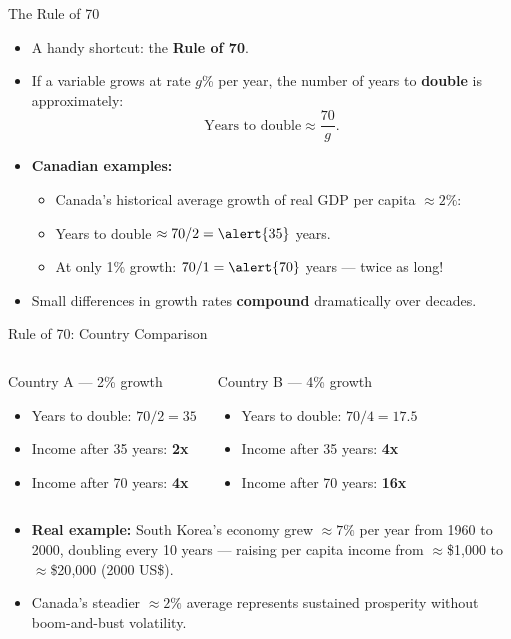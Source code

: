 \documentclass[aspectratio=169]{beamer}
\begin{document}
\begin{frame}{The Rule of 70}
\transfade
\begin{itemize}
  \item A handy shortcut: the \textbf{Rule of 70}.
  \item If a variable grows at rate $g$\% per year, the number of years to \textbf{double} is approximately:
  \[
    \text{Years to double} \approx \frac{70}{g}.
  \]
  \item \textbf{Canadian examples:}
  \begin{itemize}
    \item Canada's historical average growth of real GDP per capita $\approx 2\%$:
    \item Years to double $\approx 70 / 2 = \alert{35}$ years.
    \item At only 1\% growth: $70 / 1 = \alert{70}$ years --- twice as long!
  \end{itemize}
  \item Small differences in growth rates \textbf{compound} dramatically over decades.
\end{itemize}
\end{frame}

\begin{frame}{Rule of 70: Country Comparison}
\transfade
\begin{columns}
\begin{block}{Country A --- 2\% growth}
\begin{itemize}
  \item Years to double: $70/2 = 35$
  \item Income after 35 years: \textbf{2x}
  \item Income after 70 years: \textbf{4x}
\end{itemize}
\end{block}
\begin{block}{Country B --- 4\% growth}
\begin{itemize}
  \item Years to double: $70/4 = 17.5$
  \item Income after 35 years: \textbf{4x}
  \item Income after 70 years: \textbf{16x}
\end{itemize}
\end{block}
\end{columns}
\vspace{0.5em}
\begin{itemize}
  \item \textbf{Real example:} South Korea's economy grew $\approx 7\%$ per year from 1960 to 2000, doubling every 10 years --- raising per capita income from $\approx$\$1{,}000 to $\approx$\$20{,}000 (2000 US\$).
  \item Canada's steadier $\approx 2\%$ average represents \textcolor{leafgreen}{sustained prosperity without boom-and-bust volatility}.
\end{itemize}
\end{frame}
\end{document}
